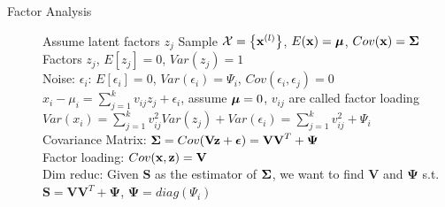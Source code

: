 \begin{description}
    \item[Factor Analysis] Assume latent factors $z_j$
        Sample $\mathcal{X} = \left\{ \mathbf{x}^{(l)} \right\}$, $E(\mathbf{x}) = \boldsymbol\mu$, $Cov(\mathbf{x}) =
        \boldsymbol\Sigma$\\
        Factors $z_j$, $E[z_j] = 0$, $Var(z_j) =1 $\\
        Noise: $\epsilon_i$: $E[\epsilon_i] = 0$, $Var(\epsilon_i) =\Psi_i$,
        $Cov(\epsilon_i, \epsilon_j) = 0$\\
        $x_i -  \mu_i = \sum_{j=1}^k v_{ij}z_j + \epsilon_i$, assume $\boldsymbol\mu=0$,
        $v_{ij}$ are called factor loading\\
        $Var(x_i) = \sum_{j=1}^k v_{ij}^2Var(z_j) + Var(\epsilon_i) =
        \sum_{j=1}^k v_{ij}^2 + \Psi_i$\\
        Covariance Matrix: $\boldsymbol\Sigma = Cov(\mathbf{V}\mathbf{z} + \boldsymbol\epsilon) =
        \mathbf{VV}^T+\boldsymbol\Psi$\\Factor loading: $Cov(\mathbf{x},
        \mathbf{z}) = \mathbf{V}$\\
        Dim reduc: Given $\mathbf{S}$ as the estimator of $\boldsymbol\Sigma$, we want to find
        $\mathbf{V}$ and $\boldsymbol \Psi$ s.t.\ $\mathbf{S} = \mathbf{VV}^T +
        \boldsymbol\Psi$, $\boldsymbol\Psi = diag(\Psi_i)$


\end{description}

